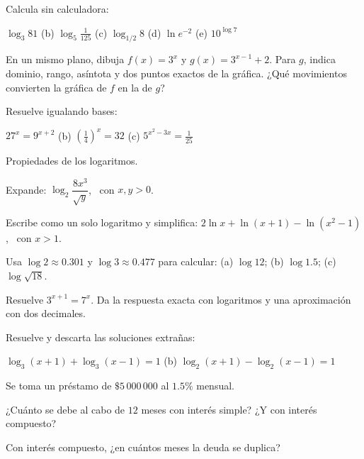 \documentclass[11pt,a4paper]{article}
\begin{document}
\taller
\begin{ejercicios}
\item Calcula sin calculadora:
  \begin{ejercicios}
  \item $\log_3 81$ \qquad (b) $\log_5\tfrac{1}{125}$ \qquad (c) $\log_{1/2}8$ \qquad (d) $\ln e^{-2}$ \qquad (e) $10^{\log 7}$
  \end{ejercicios}
\item En un mismo plano, dibuja $f(x)=3^{x}$ y $g(x)=3^{x-1}+2$. Para $g$, indica dominio, rango, asíntota y dos
  puntos exactos de la gráfica. ¿Qué movimientos convierten la gráfica de $f$ en la de $g$?
\item Resuelve igualando bases:
  \begin{ejercicios}
  \item $27^{x}=9^{x+2}$ \qquad (b) $\left(\tfrac14\right)^{x}=32$ \qquad (c) $5^{x^2-3x}=\tfrac1{25}$
  \end{ejercicios}
\item Propiedades de los logaritmos.
  \begin{ejercicios}
  \item Expande: $\log_2\dfrac{8x^{3}}{\sqrt y}$, \ con $x,y>0$.
  \item Escribe como un solo logaritmo y simplifica: $2\ln x+\ln(x+1)-\ln\left(x^2-1\right)$, \ con $x>1$.
  \end{ejercicios}
\item Usa $\log2\approx0.301$ y $\log3\approx0.477$ para calcular: (a) $\log12$; (b) $\log1.5$; (c) $\log\sqrt{18}$.
\item Resuelve $3^{x+1}=7^{x}$. Da la respuesta exacta con logaritmos y una aproximación con dos decimales.
\item Resuelve y descarta las soluciones extrañas:
  \begin{ejercicios}
  \item $\log_3(x+1)+\log_3(x-1)=1$ \qquad (b) $\log_2(x+1)-\log_2(x-1)=1$
  \end{ejercicios}
\item Se toma un préstamo de $\$5\,000\,000$ al $1.5\%$ mensual.
  \begin{ejercicios}
  \item ¿Cuánto se debe al cabo de $12$ meses con interés simple? ¿Y con interés compuesto?
  \item Con interés compuesto, ¿en cuántos meses la deuda se duplica?
  \end{ejercicios}

\end{ejercicios}
\end{document}
